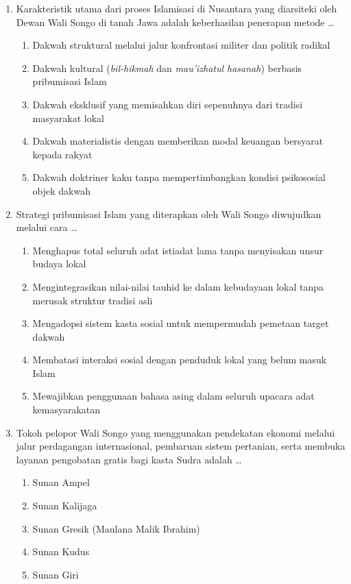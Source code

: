 \documentclass[12pt,a4paper]{article}
\begin{document}
\begin{enumerate}[leftmargin=*]

\item Karakteristik utama dari proses Islamisasi di Nusantara yang diarsiteki oleh Dewan Wali Songo di tanah Jawa adalah keberhasilan penerapan metode \dots
    \begin{enumerate}[label=\alph*.]
        \item Dakwah struktural melalui jalur konfrontasi militer dan politik radikal
        \item Dakwah kultural (\textit{bil-hikmah} dan \textit{mau'izhatul hasanah}) berbasis pribumisasi Islam
        \item Dakwah eksklusif yang memisahkan diri sepenuhnya dari tradisi masyarakat lokal
        \item Dakwah materialistis dengan memberikan modal keuangan bersyarat kepada rakyat
        \item Dakwah doktriner kaku tanpa mempertimbangkan kondisi psikososial objek dakwah
    \end{enumerate}

\item Strategi pribumisasi Islam yang diterapkan oleh Wali Songo diwujudkan melalui cara \dots
    \begin{enumerate}[label=\alph*.]
        \item Menghapus total seluruh adat istiadat lama tanpa menyisakan unsur budaya lokal
        \item Mengintegrasikan nilai-nilai tauhid ke dalam kebudayaan lokal tanpa merusak struktur tradisi asli
        \item Mengadopsi sistem kasta sosial untuk mempermudah pemetaan target dakwah
        \item Membatasi interaksi sosial dengan penduduk lokal yang belum masuk Islam
        \item Mewajibkan penggunaan bahasa asing dalam seluruh upacara adat kemasyarakatan
    \end{enumerate}

\item Tokoh pelopor Wali Songo yang menggunakan pendekatan ekonomi melalui jalur perdagangan internasional, pembaruan sistem pertanian, serta membuka layanan pengobatan gratis bagi kasta Sudra adalah \dots
    \begin{enumerate}[label=\alph*.]
        \item Sunan Ampel
        \item Sunan Kalijaga
        \item Sunan Gresik (Maulana Malik Ibrahim)
        \item Sunan Kudus
        \item Sunan Giri
    \end{enumerate}


\end{enumerate}
\end{document}

